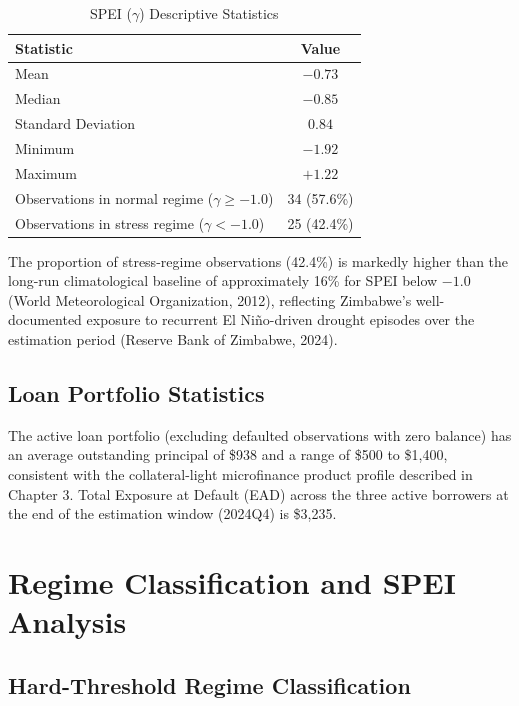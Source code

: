 \documentclass[12pt,a4paper]{article}
\begin{document}
\begin{table}[H]
\centering
\caption{SPEI ($\gamma$) Descriptive Statistics}
\label{tab:spei_stats}
\begin{tabular}{@{}lc@{}}
\toprule
\textbf{Statistic} & \textbf{Value} \\
\midrule
Mean & $-0.73$ \\
Median & $-0.85$ \\
Standard Deviation & $0.84$ \\
Minimum & $-1.92$ \\
Maximum & $+1.22$ \\
Observations in normal regime ($\gamma \geq -1.0$) & 34 (57.6\%) \\
Observations in stress regime ($\gamma < -1.0$) & 25 (42.4\%) \\
\bottomrule
\end{tabular}
\end{table}

The proportion of stress-regime observations (42.4\%) is markedly higher than the long-run climatological baseline of approximately 16\% for SPEI below $-1.0$ (World Meteorological Organization, 2012), reflecting Zimbabwe's well-documented exposure to recurrent El Niño-driven drought episodes over the estimation period (Reserve Bank of Zimbabwe, 2024).

\subsection{Loan Portfolio Statistics}

The active loan portfolio (excluding defaulted observations with zero balance) has an average outstanding principal of \$938 and a range of \$500 to \$1,400, consistent with the collateral-light microfinance product profile described in Chapter 3. Total Exposure at Default (EAD) across the three active borrowers at the end of the estimation window (2024Q4) is \$3,235.

\section{Regime Classification and SPEI Analysis}

\subsection{Hard-Threshold Regime Classification}
\end{document}
